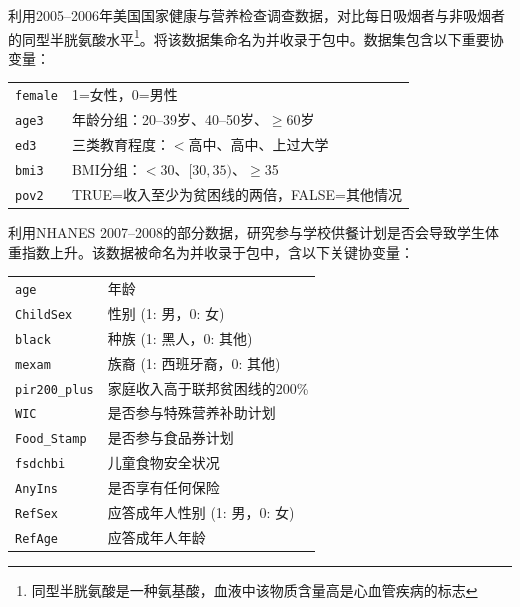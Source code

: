  
  \begin{example}
 [吸烟与同型半胱氨酸]\label{eg::nhanes2005-2006}
 \citet{bazzano2003relationship}利用2005–2006年美国国家健康与营养检查调查数据，对比每日吸烟者与非吸烟者的同型半胱氨酸水平\footnote{同型半胱氨酸是一种氨基酸，血液中该物质含量高是心血管疾病的标志}。\citet{rosenbaum2018sensitivity}将该数据集命名为并收录于包中。数据集包含以下重要协变量：
 
\begin{tabular}{ll}
\hline 
\texttt{female} &
1=女性，0=男性
\\
\texttt{age3} &
年龄分组：20–39岁、40–50岁、$\geq $60岁
\\
\texttt{ed3} &
三类教育程度：$<$高中、高中、上过大学
\\
\texttt{bmi3}&
BMI分组：$<$30、$[30,35)$、$\geq $35
\\
\texttt{pov2}&
TRUE=收入至少为贫困线的两倍，FALSE=其他情况\\
\hline 
\end{tabular} 

 \end{example}
 
 
 
 
   \begin{example} 
 [学校供餐计划与体重指数]\label{eg::chan-bmi-ATE}
 \citet{chan2016globally}利用NHANES 2007–2008的部分数据，研究参与学校供餐计划是否会导致学生体重指数上升。该数据被命名为并收录于包中，含以下关键协变量：
 
\begin{tabular}{ll}
\hline 
\texttt{age}&
年龄  
\\
\texttt{ChildSex}&
性别 (1: 男，0: 女)
\\
\texttt{black}&
种族 (1: 黑人，0: 其他) 
\\
\texttt{mexam}&
族裔 (1: 西班牙裔，0: 其他)
\\
\texttt{pir200\_plus}&
家庭收入高于联邦贫困线的200\%  \\
\texttt{WIC}&
是否参与特殊营养补助计划 \\
\texttt{Food\_Stamp}&
是否参与食品券计划   \\
\texttt{fsdchbi}&
儿童食物安全状况  \\
\texttt{AnyIns}&
是否享有任何保险 \\
\texttt{RefSex}&
应答成年人性别 (1: 男，0: 女) \\
\texttt{RefAge}&
应答成年人年龄\\
\hline 
\end{tabular} 

 \end{example}
 
